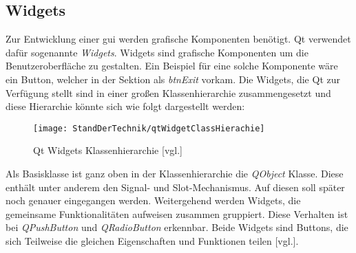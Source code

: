 \subsection{Widgets}
\label{subsec:widgets}
Zur Entwicklung einer \ac{gui} werden grafische Komponenten benötigt. Qt verwendet dafür sogenannte \emph{Widgets}. Widgets sind grafische
Komponenten um die Benutzeroberfläche zu gestalten. Ein Beispiel für eine solche Komponente wäre ein Button, welcher in der Sektion
\emph{} als \emph{btnExit} vorkam.
\newline
\newline
Die Widgets, die Qt zur Verfügung stellt sind in einer großen Klassenhierarchie zusammengesetzt
und diese Hierarchie könnte sich wie folgt dargestellt werden:
\newpage
\begin{figure}[h]
    \centering
    \texttt{[image: StandDerTechnik/qtWidgetClassHierachie]}
    \caption[Qt Widgets Klassenhierachie]{Qt Widgets Klassenhierarchie
    \cite{GettingStartedQt}[vgl.]}
    \label{img:qtWidgetClassHierachie}
\end{figure}

Als Basisklasse ist ganz oben in der Klassenhierarchie die \emph{QObject} Klasse. Diese
enthält unter anderem den Signal- und Slot-Mechanismus. Auf diesen soll später noch genauer
eingegangen werden.
Weitergehend werden Widgets, die gemeinsame Funktionalitäten aufweisen zusammen gruppiert. Diese
Verhalten ist bei \emph{QPushButton} und \emph{QRadioButton} erkennbar. Beide Widgets sind
Buttons, die sich Teilweise die gleichen Eigenschaften und Funktionen teilen
\cite{GettingStartedQt}[vgl.].
